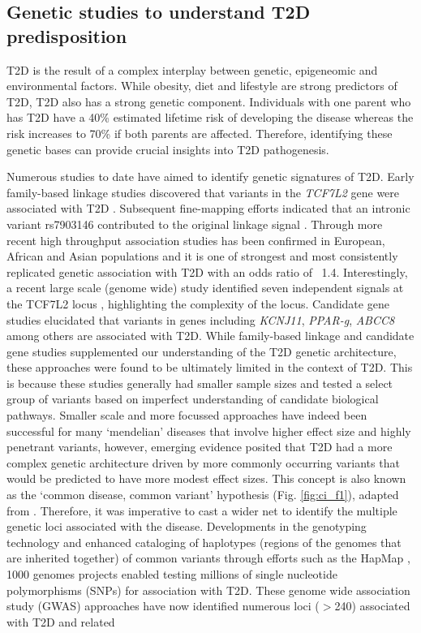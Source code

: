 \subsection{Genetic studies to understand T2D predisposition}
T2D is the result of a complex interplay between genetic, epigeneomic and environmental factors. While obesity, diet and lifestyle are strong predictors of T2D, T2D also has a strong genetic component. Individuals with one parent who has T2D have a 40\% estimated lifetime risk of developing the disease whereas the risk increases to 70\% if  both parents are affected. Therefore, identifying these genetic bases can provide crucial insights into T2D pathogenesis. 


Numerous studies to date have aimed to identify genetic signatures of T2D. Early family-based linkage studies discovered that variants in the \textit{TCF7L2} gene were associated with T2D \cite{duggiralaLinkageTypeDiabetes1999}. Subsequent fine-mapping efforts indicated that an intronic variant rs7903146 contributed to the original linkage signal  \cite{duggiralaLinkageTypeDiabetes1999, grantVariantTranscriptionFactor2006}. Through more recent high throughput association studies has been confirmed in European, African and Asian populations and it is one of strongest and most consistently replicated genetic association with T2D with an odds ratio of ~1.4. Interestingly, a recent large scale (genome wide) study identified seven independent signals at the TCF7L2 locus \cite{mahajanFinemappingTypeDiabetes2018}, highlighting the complexity of the locus. Candidate gene studies elucidated that variants in genes including \textit{KCNJ11}, \textit{PPAR-g}, \textit{ABCC8} among others are associated with T2D. While family-based linkage and candidate gene studies supplemented our understanding of the T2D genetic architecture, these approaches were found to be ultimately limited in the context of T2D. This is because these studies generally had smaller sample sizes and tested a select group of variants based on imperfect understanding of candidate biological pathways. Smaller scale and more focussed approaches have indeed been successful for many ‘mendelian’ diseases that involve higher effect size and highly penetrant variants, however, emerging evidence posited that T2D had a more complex genetic architecture driven by more commonly occurring variants that would be predicted to have more modest effect sizes. This concept is also known as the ‘common disease, common variant’ hypothesis (Fig. \ref{fig:ci_f1}), adapted from \cite{manolioFindingMissingHeritability2009}. Therefore, it was imperative to cast a wider net to identify the multiple genetic loci associated with the disease. Developments in the genotyping technology and enhanced cataloging of haplotypes (regions of the genomes that are inherited together) of common variants through efforts such as the HapMap \cite{theinteranationalhapmapconsortiumInternationalHapMapProject2003}, 1000 genomes \cite{the1000genomesprojectconsortiumGlobalReferenceHuman2015a} projects enabled testing millions of single nucleotide polymorphisms (SNPs) for association with T2D. These genome wide association study (GWAS) approaches have now identified numerous loci ($>$240) associated with T2D and related 